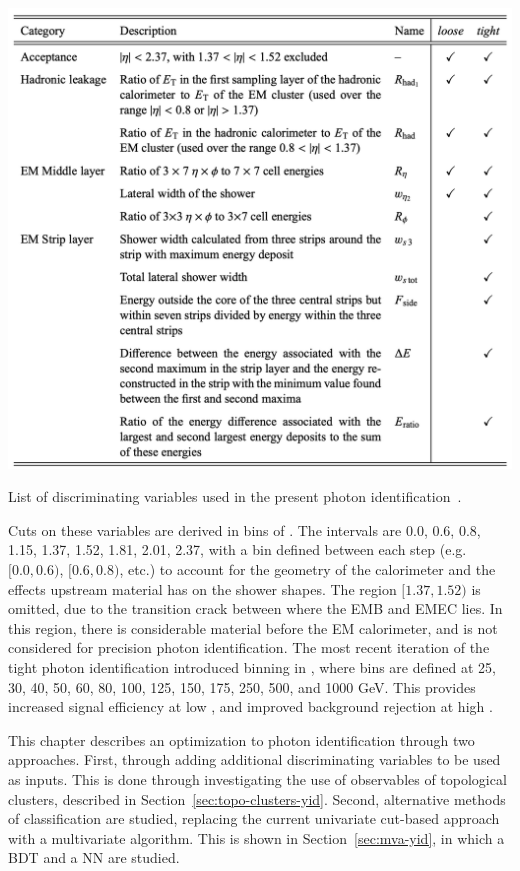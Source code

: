 \begin{table}
    \centering
    \includegraphics[width=.90\textwidth]{chapters/chapter4_photonID/images/ss-table.png}
    \caption[List of discriminating variables used in the present photon identification.]
    {List of discriminating variables used in the present photon identification~\cite{r1-photonID}.}
    \label{tab:ss-vars-table}
\end{table}

Cuts on these variables are derived in bins of \abseta. The intervals are 0.0, 0.6, 0.8, 1.15, 1.37, 1.52, 1.81, 2.01, 2.37, with a bin defined between each step (e.g. $[0.0,0.6)$, $[0.6,0.8)$, etc.) to account for the geometry of the calorimeter and the effects upstream material has on the shower shapes. The region $[1.37,1.52)$ is omitted, due to the transition crack between where the \gls{EMB} and \gls{EMEC} lies. In this region, there is considerable material before the \gls{EM} calorimeter, and is not considered for precision photon identification. The most recent iteration of the tight photon identification introduced binning in \pt, where bins are defined at 25, 30, 40, 50, 60, 80, 100, 125, 150, 175, 250, 500, and 1000 GeV. This provides increased signal efficiency at low \pt, and improved background rejection at high \pt.

This chapter describes an optimization to photon identification through two approaches. First, through adding additional discriminating variables to be used as inputs. This is done through investigating the use of observables of topological clusters, described in Section~\ref{sec:topo-clusters-yid}. Second, alternative methods of classification are studied, replacing the current univariate cut-based approach with a multivariate algorithm. This is shown in Section~\ref{sec:mva-yid}, in which a \gls{BDT} and a \gls{NN} are studied.


